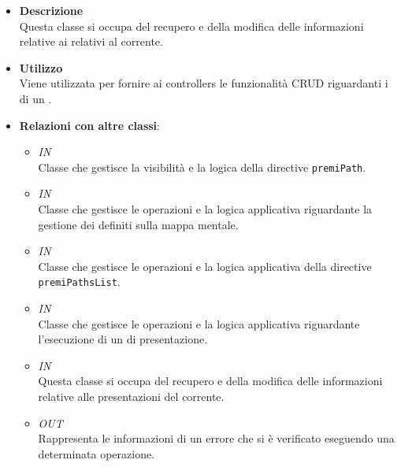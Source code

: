 \begin{itemize}
\item \textbf{Descrizione}\\
Questa classe si occupa del recupero e della modifica delle informazioni relative ai  relativi al  corrente.
\item \textbf{Utilizzo}\\
Viene utilizzata per fornire ai controllers le funzionalità CRUD riguardanti i  di un .
\item \textbf{Relazioni con altre classi}:
\begin{itemize}
\item \textit{IN} \hyperref[\nogloxy{Premi::Front-End::Controllers::PathController}]{}\\
Classe che gestisce la visibilità e la logica della directive \texttt{premiPath}.
\item \textit{IN} \hyperref[\nogloxy{Premi::Front-End::Controllers::PathsEditorController}]{}\\
Classe che gestisce le operazioni e la logica applicativa riguardante la gestione dei  definiti sulla mappa mentale.
\item \textit{IN} \hyperref[\nogloxy{Premi::Front-End::Controllers::PathsListController}]{}\\
Classe che gestisce le operazioni e la logica applicativa della directive \texttt{premiPathsList}.
\item \textit{IN} \hyperref[\nogloxy{Premi::Front-End::Controllers::PresentationViewerController}]{}\\
Classe che gestisce le operazioni e la logica applicativa riguardante l’esecuzione di un  di presentazione.
\item \textit{IN} \hyperref[\nogloxy{Premi::Front-End::Services::PresentationService}]{}\\
Questa classe si occupa del recupero e della modifica delle informazioni relative alle presentazioni del  corrente.
\item \textit{OUT} \hyperref[\nogloxy{Premi::Front-End::Model::ErrorInfo}]{}\\
Rappresenta le informazioni di un errore che si è verificato eseguendo una determinata operazione.

\end{itemize}
\end{itemize}
